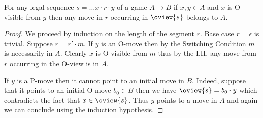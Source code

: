 \begin{lemma}
\label{lem:oviewsegmentinB}
For any legal sequence $s = \ldots x \cdot r \cdot y$ of a game $A\rightarrow B$ if $x, y \in A$ and $x$ is O-visible from $y$ then any move in $r$ occurring in $\oview{s}$ belongs to $A$.
\end{lemma}
\begin{proof}
We proceed by induction on the length of the segment $r$.
Base case $r=\epsilon$ is trivial. Suppose $r = r' \cdot m$.
If $y$ is an O-move then by the Switching Condition
$m$ is necessarily in $A$. Clearly $x$ is O-visible from $m$ thus  by the I.H. any move from $r$ occurring in the O-view is in $A$.

If $y$ is a P-move then it cannot point to an initial move in $B$. Indeed, suppose that it points to an initial O-move $b_0 \in B$ then
we have $\oview{s} = b_0 \cdot y$ which contradicts the fact that $x\in \oview{s}$.
Thus $y$ points to a move in $A$ and again we can conclude using the induction hypothesis.
\end{proof}


